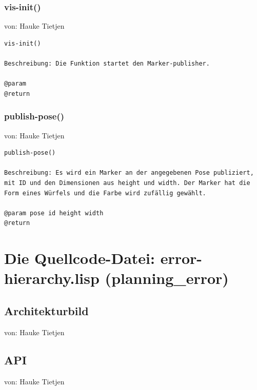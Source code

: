 \documentclass{suturo}
\makeatletter
\newcommand{\chapterauthor}[1]{%
  {\parindent0pt\vspace*{-27pt}%
  \linespread{0}\small\begin{flushright}von: #1\end{flushright}%
  \par\nobreak\vspace*{0pt}}
  \@afterheading%
}
\makeatother
\begin{document}
\subsubsection{vis-init()}
\chapterauthor{Hauke Tietjen}
\begin{verbatim}
vis-init()

Beschreibung: Die Funktion startet den Marker-publisher.

@param 
@return 
\end{verbatim}

\subsubsection{publish-pose()}
\chapterauthor{Hauke Tietjen}
\begin{verbatim}
publish-pose()

Beschreibung: Es wird ein Marker an der angegebenen Pose publiziert,
mit ID und den Dimensionen aus height und width. Der Marker hat die
Form eines Würfels und die Farbe wird zufällig gewählt.

@param pose id height width
@return 
\end{verbatim}

\section{Die Quellcode-Datei: error-hierarchy.lisp (planning\_error)}
\subsection{Architekturbild}
\chapterauthor{Hauke Tietjen}
\begin{figure}[!htb]
\end{figure}


\subsection{API}
\chapterauthor{Hauke Tietjen}
\end{document}

